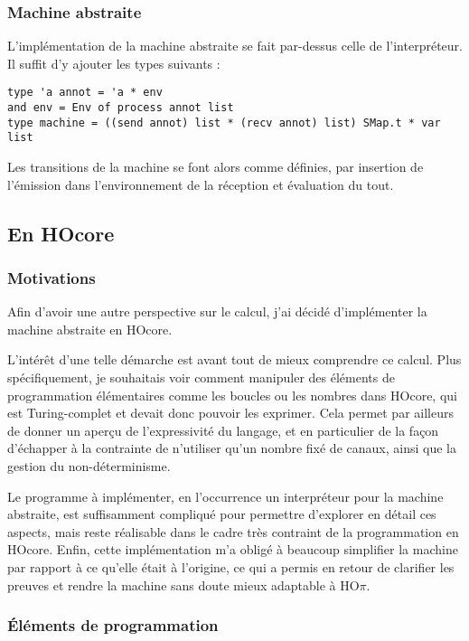 \documentclass[11pt]{article}
\begin{document}
\subsubsection{Machine abstraite}
\label{sec-4-1-2}

L'implémentation de la machine abstraite se fait par-dessus celle de l'interpréteur.
Il suffit d'y ajouter les types suivants :
\begin{verbatim}
type 'a annot = 'a * env
and env = Env of process annot list
type machine = ((send annot) list * (recv annot) list) SMap.t * var list
\end{verbatim}

Les transitions de la machine se font alors comme définies, par insertion de l'émission dans l'environnement de la réception et évaluation du tout.

\subsection{En HOcore}
\label{sec-4-2}
\subsubsection{Motivations}
\label{sec-4-2-1}

Afin d'avoir une autre perspective sur le calcul, j'ai décidé d'implémenter la machine abstraite en HOcore.

L'intérêt d'une telle démarche est avant tout de mieux comprendre ce calcul. Plus spécifiquement, je souhaitais voir comment manipuler des éléments de programmation élémentaires comme les boucles ou les nombres dans HOcore, qui est Turing-complet et devait donc pouvoir les exprimer.
Cela permet par ailleurs de donner un aperçu de l'expressivité du langage, et en particulier de la façon d'échapper à la contrainte de n'utiliser qu'un nombre fixé de canaux, ainsi que la gestion du non-déterminisme.

Le programme à implémenter, en l'occurrence un interpréteur pour la machine abstraite, est suffisamment compliqué pour permettre d'explorer en détail ces aspects, mais reste réalisable dans le cadre très contraint de la programmation en HOcore.
Enfin, cette implémentation m'a obligé à beaucoup simplifier la machine par rapport à ce qu'elle était à l'origine, ce qui a permis en retour de clarifier les preuves et rendre la machine sans doute mieux adaptable à HO$\pi$.

\subsubsection{\'Eléments de programmation}
\label{sec-4-2-2}
\end{document}
